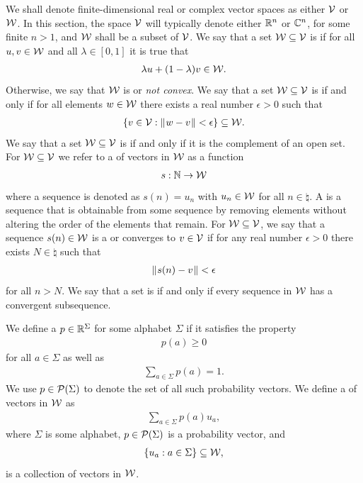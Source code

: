 We shall denote finite-dimensional real or complex vector spaces as either $\V$ or $\W$. In this section, the space $\V$ will typically denote either $\real^n$ or $\complex^n$, for some finite $n > 1$, and $\W$ shall be a subset of $\V$. We say that a set $\W \subseteq \V$ is  if for all $u,v \in \W$ and all $\lambda \in [0,1]$ it is true that 
\begin{align}
	\lambda u + (1-\lambda)v \in \W.
\end{align}
Otherwise, we say that $\W$ is  or \emph{not convex}. We say that a set $\W \subseteq \V$ is  if and only if for all elements $w \in \W$ there exists a real number $\epsilon > 0$ such that 
\begin{align}
	\{ v \in \V : \norm{w-v} < \epsilon \} \subseteq \W.
\end{align}
We say that a set $\W \subseteq \V$ is  if and only if it is the complement of an open set. For $\W \subseteq \V$ we refer to a  of vectors in $\W$ as a function 
\begin{align}
	s: \natural \rightarrow \W
\end{align} 
where a sequence is denoted as $s(n) = u_n$ with $u_n \in \W$ for all $n \in \natural$. A  is a sequence that is obtainable from some sequence by removing elements without altering the order of the elements that remain. For $\W \subseteq \V$, we say that a sequence $s(n) \in \W$ is a  or converges to $v \in \V$ if for any real number $\epsilon > 0$ there exists $N \in \natural$ such that
\begin{align}
	\norm{s(n) - v} < \epsilon
\end{align}
for all $n > N$. We say that a set is  if and only if every sequence in $\W$ has a convergent subsequence.

We define a  $p \in \real^{\Sigma}$ for some alphabet $\Sigma$ if it satisfies the property 
\begin{align}
	p(a) \geq 0
\end{align} 
for all $a \in \Sigma$ as well as 
\begin{align}
	\sum_{a \in \Sigma} p(a) = 1. 
\end{align}
We use $p \in \P(\Sigma)$ to denote the set of all such probability vectors. We define a  of vectors in $\W$ as 
\begin{align}
	\sum_{a \in \Sigma} p(a) u_a,
\end{align}
where $\Sigma$ is some alphabet, $p \in \P(\Sigma)$ is a probability vector, and 
\begin{align}
	\{ u_a : a \in \Sigma \} \subseteq \W,
\end{align}
is a collection of vectors in $\W$. 


